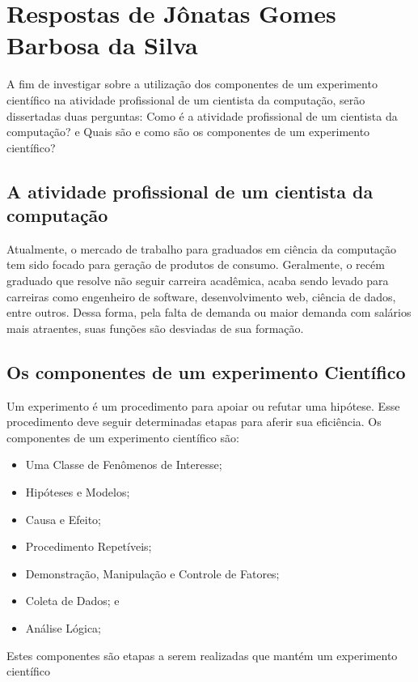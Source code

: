 \section{Respostas de Jônatas Gomes Barbosa da Silva}
A fim de investigar sobre a utilização dos componentes de um experimento científico na atividade profissional de um cientista da computação, serão dissertadas duas perguntas: Como é a atividade profissional de um cientista da computação? e Quais são e como são os componentes de um experimento científico?

\subsection{A atividade profissional de um cientista da computação}
Atualmente, o mercado de trabalho para graduados em ciência da computação tem sido focado para geração de produtos de consumo. Geralmente, o recém graduado que resolve não seguir carreira acadêmica, acaba sendo levado para carreiras como engenheiro de software, desenvolvimento web, ciência de dados, entre outros. Dessa forma, pela falta de demanda ou maior demanda com salários mais atraentes, suas funções são desviadas de sua formação. 

\subsection{Os componentes de um experimento Científico}
Um \gls{experimento} é um procedimento para apoiar ou refutar uma hipótese. Esse procedimento deve seguir determinadas etapas para aferir sua eficiência. Os componentes de um experimento científico são:
\begin{itemize}
    \item Uma Classe de Fenômenos de Interesse;
    \item Hipóteses e Modelos;
    \item Causa e Efeito;
    \item Procedimento Repetíveis;
    \item Demonstração, Manipulação e Controle de Fatores;
    \item Coleta de Dados; e
    \item Análise Lógica;
\end{itemize}

Estes componentes são etapas a serem realizadas que mantém um experimento científico